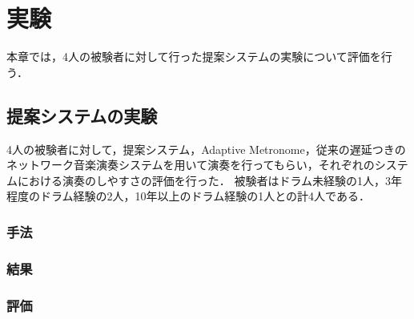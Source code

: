 \chapter{実験}
\label{evaluation}
本章では，4人の被験者に対して行った提案システムの実験について評価を行う．

\section{提案システムの実験}
4人の被験者に対して，提案システム，Adaptive Metronome，従来の遅延つきのネットワーク音楽演奏システムを用いて演奏を行ってもらい，それぞれのシステムにおける演奏のしやすさの評価を行った．
被験者はドラム未経験の1人，3年程度のドラム経験の2人，10年以上のドラム経験の1人との計4人である．
\subsection{手法}
\subsection{結果}
\subsection{評価}


